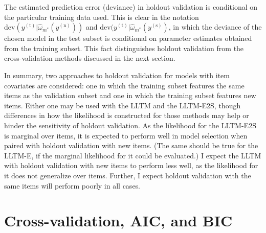 The estimated prediction error (deviance) in holdout validation is conditional on the particular training data used. This is clear in the notation
		$\mathrm{dev}(y^{(\mathrm{t})} | \hat \omega_{m^*}(y^{(\mathrm{n})}))$ and
		$\mathrm{dev}(y^{(\mathrm{t})} | \hat \omega_{m^*}(y^{(\mathrm{s})})$, 
		in which the deviance of the chosen model in the test subset is conditional on parameter estimates obtained from the training subset.
This fact distinguishes holdout validation from the cross-validation methods discussed in the next section.
		
In summary, two approaches to holdout validation for models with item covariates are considered: one in which the training subset features the same items as the validation subset and one in which the training subset features new items. Either one may be used with the LLTM and the LLTM-E2S, though differences in how the likelihood is constructed for those methods may help or hinder the sensitivity of holdout validation. As the likelihood for the LLTM-E2S is marginal over items, it is expected to perform well in model selection when paired with holdout validation with new items. (The same should be true for the LLTM-E, if the marginal likelihood for it could be evaluated.) I expect the LLTM with holdout validation with new items to perform less well, as the likelihood for it does not generalize over items. Further, I expect holdout validation with the same items will perform poorly in all cases.



\section{Cross-validation, AIC, and BIC}

